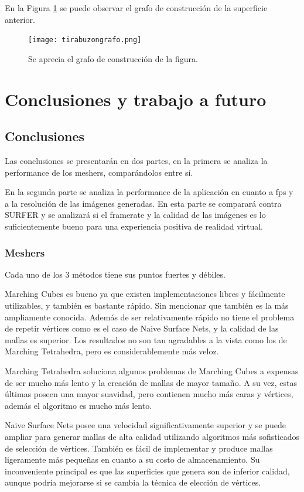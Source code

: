 \documentclass[12pt]{article}
\begin{document}
En la Figura \ref{grafobz} se puede observar el grafo de construcción de la superficie anterior. 
\begin{figure}[h!]
\texttt{[image: tirabuzongrafo.png]}
\caption{Se aprecia el grafo de construcción de la figura.}
\label{grafobz}
\end{figure}
\clearpage
\section{Conclusiones y trabajo a futuro}
\subsection{Conclusiones}
\noindent Las conclusiones se presentarán en dos partes, en la primera se analiza la performance de los meshers, comparándolos entre sí. 

En la segunda parte se analiza la performance de la aplicación en cuanto a fps y a la resolución de las imágenes generadas. En esta parte se comparará contra SURFER y se analizará si el framerate y la calidad de las imágenes es lo suficientemente bueno para una experiencia positiva de realidad virtual.
\subsubsection{Meshers}
\noindent Cada uno de los 3 métodos tiene sus puntos fuertes y débiles. 

Marching Cubes es bueno ya que existen implementaciones libres y fácilmente utilizables, y también es bastante rápido. Sin mencionar que también es la más ampliamente conocida. Además de ser relativamente rápido no tiene el problema de repetir vértices como es el caso de Naive Surface Nets, y la calidad de las mallas es superior. Los resultados no son tan agradables a la vista como los de Marching Tetrahedra, pero es considerablemente más veloz. 

Marching Tetrahedra soluciona algunos problemas de Marching Cubes a expensas de ser mucho más lento y la creación de mallas de mayor tamaño. A su vez, estas últimas poseen una mayor suavidad, pero contienen mucho más caras y vértices, además  el algoritmo es mucho más lento.

Naive Surface Nets posee una velocidad significativamente superior y se puede ampliar para generar mallas de alta calidad utilizando algoritmos más sofisticados de selección de vértices. También es fácil de implementar y produce mallas ligeramente más pequeñas en cuanto a su costo de almacenamiento. Su inconveniente principal es que las superficies que genera son de inferior calidad, aunque podría mejorarse si se cambia la técnica de elección de vértices. 
\end{document}
